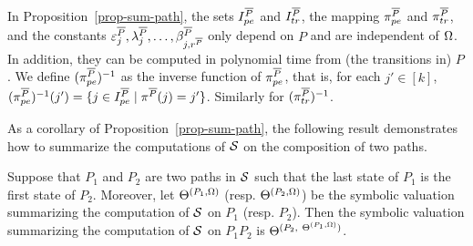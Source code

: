 In Proposition~\ref{prop-sum-path}, the sets $I^{\overline{P}}_{pe}$ and $I^{\overline{P}}_{tr}$, the mapping $\pi^{\overline{P}}_{pe}$ and $\pi^{\overline{P}}_{tr}$, and the constants $\varepsilon^{\overline{P}}_j,\lambda^{\overline{P}}_j, \dots, \beta^{\overline{P}}_{j,r^{\overline{P}}}$ only depend on $P$ and are independent of $\Omega$. In addition, they can be computed in polynomial time from (the transitions in) $P$.
We define $(\pi^{\overline{P}}_{pe})^{-1}$ as the inverse function of $\pi^{\overline{P}}_{pe}$, that is, for each $j' \in [k]$, $(\pi^{\overline{P}}_{pe})^{-1}(j')=\{j \in I^{\overline{P}}_{pe}  \mid \pi^{\overline{P}}(j)= j'\}$. Similarly for $(\pi^{\overline{P}}_{tr})^{-1}$.

As a corollary of Proposition~\ref{prop-sum-path}, the following result demonstrates how to summarize the computations of ${\mathcal{S} }$ on the composition of two paths.

\begin{corollary}\label{cor-comp-two-paths}
Suppose that $P_1$ and $P_2$ are two paths in ${\mathcal{S} }$ such that the last state of $P_1$ is the first state of $P_2$. Moreover, let $\Theta^{(P_1, \Omega)}$ (resp. $\Theta^{(P_2, \Omega)}$) be the symbolic valuation summarizing the computation of ${\mathcal{S} }$ on $P_1$ (resp. $P_2$). Then the symbolic valuation summarizing the computation of ${\mathcal{S} }$ on $P_1 P_2$ is $\sumf^{(P_2,\ \sumf^{(P_1,\initval)})}$.
\end{corollary}

